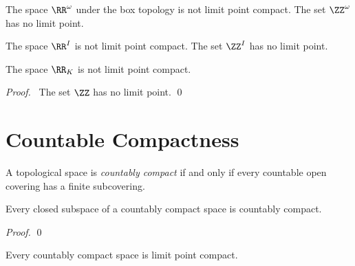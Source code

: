 \begin{proposition}
    The space $\RR^\omega$ under the box topology is not limit point compact.
    The set $\ZZ^\omega$ has no limit point.
\end{proposition}

\begin{proposition}
    The space $\RR^I$ is not limit point compact. The set $\ZZ^I$ has no limit point.
\end{proposition}

\begin{proposition}
    The space $\RR_K$ is not limit point compact.
\end{proposition}

\begin{proof}
    \pf\ The set $\ZZ$ has no limit point. \qed
\end{proof}

\section{Countable Compactness}

\begin{definition}
    A topological space is \emph{countably compact} if and only if every
    countable open covering has a finite subcovering.
\end{definition}

\begin{proposition}[AC]
    Every closed subspace of a countably compact space is countably compact.
\end{proposition}

\begin{proof}
    \pf
    \qed
\end{proof}

\begin{proposition}[AC]
    Every countably compact space is limit point compact.
\end{proposition}

